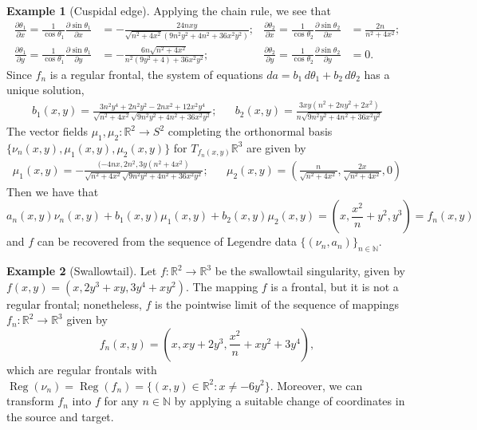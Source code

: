 \documentclass{amsart}
\theoremstyle{definition}
\theoremstyle{definition}
\newtheorem{example}{Example}
\theoremstyle{definition}
\newcommand{\mb}{\mathbb}
\DeclareMathOperator{\Reg}{Reg}
\begin{document}
{\begin{example}[Cuspidal edge]
Applying the chain rule, we see that
\begin{align*}
	\frac{\partial \theta_1}{\partial x}=\frac{1}{\cos \theta_1}\frac{\partial \sin \theta_1}{\partial x}&=-\frac{24 n x y}{\sqrt{n^2+4 x^2} \left(9 n^2 y^2+4 n^2+36 x^2 y^2\right)};
	&
	\frac{\partial \theta_2}{\partial x}=\frac{1}{\cos \theta_2}\frac{\partial \sin \theta_2}{\partial x}&=\frac{2 n}{n^2 + 4 x^2};
	\\
	\frac{\partial \theta_1}{\partial y}=\frac{1}{\cos \theta_1}\frac{\partial \sin \theta_1}{\partial y}&=-\frac{6 n \sqrt{n^2+4 x^2}}{n^2 \left(9 y^2+4\right)+36 x^2 y^2};&
	\frac{\partial \theta_2}{\partial y}=\frac{1}{\cos \theta_2}\frac{\partial \sin \theta_2}{\partial y}&=0.
\end{align*}
Since $f_n$ is a regular frontal, the system of equations $da=b_1\,d\theta_1+b_2\,d\theta_2$ has a unique solution,
\begin{align*}
	b_1(x,y)=\frac{3 n^2 y^4+2 n^2 y^2-2 n x^2+12 x^2 y^4}{\sqrt{n^2+4 x^2} \sqrt{9 n^2 y^2+4 n^2+36 x^2 y^2}}; && b_2(x,y)=\frac{3 x y \left(n^2+2 n y^2+2 x^2\right)}{n \sqrt{9 n^2 y^2+4 n^2+36 x^2 y^2}}
\end{align*}
The vector fields $\mu_1, \mu_2\colon \mb{R}^2 \to S^2$ completing the orthonormal basis $\{\nu_n(x,y),\mu_1(x,y),\mu_2(x,y)\}$ for $T_{f_n(x,y)}\mb{R}^3$ are given by
\begin{align*}
	\mu_1(x,y)=-\frac{(-4 n x, 2n^2, 3y(n^2+4x^2)}{\sqrt{n^2+4 x^2} \sqrt{9 n^2 y^2+4 n^2+36 x^2 y^2}};
		&&
	\mu_2(x,y)=\left(\frac{n}{\sqrt{n^2+4 x^2}},\frac{2 x}{\sqrt{n^2+4 x^2}},0\right)
\end{align*} 
Then we have that
	\[a_n(x,y)\nu_n(x,y)+b_1(x,y)\mu_1(x,y)+b_2(x,y)\mu_2(x,y)=\left(x,\frac{x^2}{n}+y^2,y^3\right)=f_n(x,y)\]
and $f$ can be recovered from the sequence of Legendre data $\{(\nu_n,a_n)\}_{n \in \mb{N}}$.
\end{example}


\begin{example}[Swallowtail]
Let $f\colon \mb{R}^2 \to \mb{R}^3$ be the swallowtail singularity, given by $f(x,y)=(x,2y^3+xy,3y^4+xy^2)$.
{The mapping $f$ is a frontal, but it is not a regular frontal; nonetheless, }$f$ is the pointwise limit of the sequence of mappings $f_n\colon \mb{R}^2 \to \mb{R}^3$ given by
	\[f_n(x,y)=\left(x,x y+2 y^3,\frac{x^2}{n}+x y^2+3 y^4\right),\]
which are regular frontals with $\Reg(\nu_n)=\Reg(f_n)=\{(x,y) \in \mb{R}^2: x\neq -6y^2\}$.
Moreover, we can transform $f_n$ into $f$ for any $n \in \mb{N}$ by applying a suitable change of coordinates in the source and target.


\end{example}}
\end{document}
